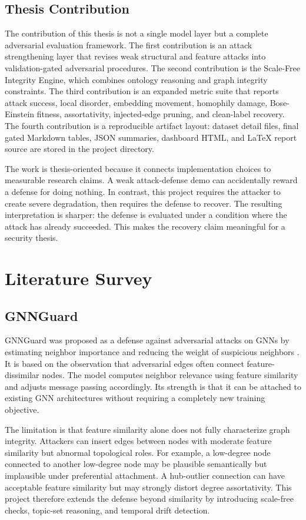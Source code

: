 \documentclass[12pt,oneside]{report}
\begin{document}
\section{Thesis Contribution}
The contribution of this thesis is not a single model layer but a complete adversarial evaluation framework. The first contribution is an attack strengthening layer that revises weak structural and feature attacks into validation-gated adversarial procedures. The second contribution is the Scale-Free Integrity Engine, which combines ontology reasoning and graph integrity constraints. The third contribution is an expanded metric suite that reports attack success, local disorder, embedding movement, homophily damage, Bose-Einstein fitness, assortativity, injected-edge pruning, and clean-label recovery. The fourth contribution is a reproducible artifact layout: dataset detail files, final gated Markdown tables, JSON summaries, dashboard HTML, and LaTeX report source are stored in the project directory.

The work is thesis-oriented because it connects implementation choices to measurable research claims. A weak attack-defense demo can accidentally reward a defense for doing nothing. In contrast, this project requires the attacker to create severe degradation, then requires the defense to recover. The resulting interpretation is sharper: the defense is evaluated under a condition where the attack has already succeeded. This makes the recovery claim meaningful for a security thesis.

\chapter{Literature Survey}
\section{GNNGuard}
GNNGuard was proposed as a defense against adversarial attacks on GNNs by estimating neighbor importance and reducing the weight of suspicious neighbors \cite{zhang2020gnnguard}. It is based on the observation that adversarial edges often connect feature-dissimilar nodes. The model computes neighbor relevance using feature similarity and adjusts message passing accordingly. Its strength is that it can be attached to existing GNN architectures without requiring a completely new training objective.

The limitation is that feature similarity alone does not fully characterize graph integrity. Attackers can insert edges between nodes with moderate feature similarity but abnormal topological roles. For example, a low-degree node connected to another low-degree node may be plausible semantically but implausible under preferential attachment. A hub-outlier connection can have acceptable feature similarity but may strongly distort degree assortativity. This project therefore extends the defense beyond similarity by introducing scale-free checks, topic-set reasoning, and temporal drift detection.
\end{document}
